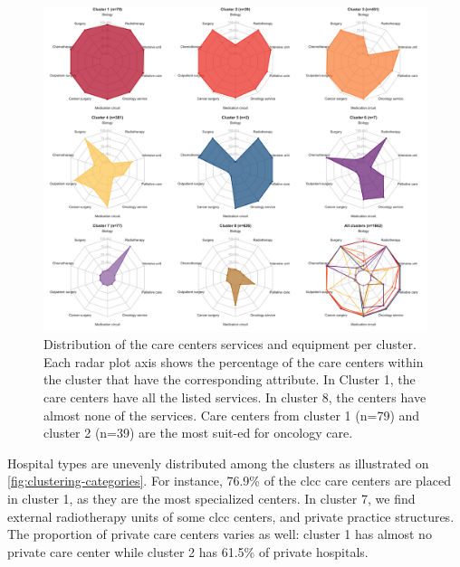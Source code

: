\begin{figure}[H]
    \includegraphics[width=\textwidth]{images/camion/fig1_clusters_services.png}
    \centering
    \caption{
        Distribution of the care centers services and equipment per cluster. Each radar plot axis shows the percentage of the care centers within the cluster that have the corresponding attribute. In Cluster 1, the care centers have all the listed services. In cluster 8, the centers have almost none of the services. Care centers from cluster 1 (n=79) and cluster 2 (n=39) are the most suit-ed for oncology care.
    }
    \label{fig:clustering-spider}
\end{figure}

Hospital types are unevenly distributed among the clusters as illustrated on \cref{fig:clustering-categories}. For instance, 76.9\% of the \ac{clcc} care centers are placed in cluster 1, as they are the most specialized centers. In cluster 7, we find external radiotherapy units of some \ac{clcc} centers, and private practice structures. The proportion of private care centers varies as well: cluster 1 has almost no private care center while cluster 2 has 61.5\% of private hospitals.

